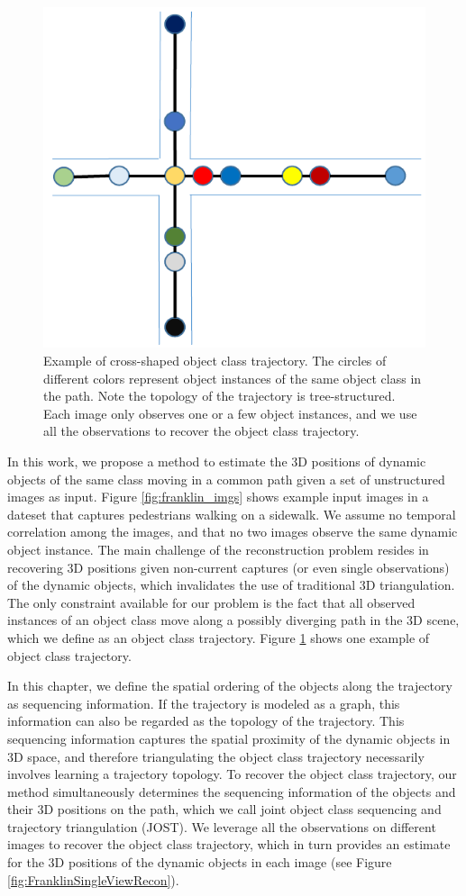 \begin{figure}
\centering
\includegraphics[width=0.65\linewidth]{chapter4/resource/path_cropped.pdf}
\caption[Example of cross-shaped object class trajectory.]{Example of cross-shaped object class trajectory. The circles of different colors represent object instances of the same object class in the path. Note the topology of the trajectory is tree-structured. Each image only observes one or a few object instances, and we use all the observations to recover the object class trajectory.}
\label{fig:oct_example}
\end{figure}

In this work, we propose a method to estimate the 3D positions of dynamic objects of the same class moving in a common path given a set of unstructured images as input. 
Figure \ref{fig:franklin_imgs} shows example input images in a dateset that captures  pedestrians walking on a sidewalk. We assume no temporal correlation among the images, and that no two images observe the same dynamic object instance. 
The main challenge of the reconstruction problem resides in recovering 3D positions given  non-current captures (or even single observations) of the dynamic objects, which invalidates the use of traditional 3D triangulation. The only constraint available for our problem is the fact that all observed instances of an object class move along a possibly diverging path in the 3D scene, which we define as an object class trajectory.
Figure \ref{fig:oct_example} shows one example of object class trajectory.

In this chapter, we define the spatial ordering of the objects along the trajectory as sequencing information. If the trajectory is modeled as a graph, this information can also be regarded as the topology of the trajectory. This sequencing information captures the spatial proximity of the dynamic objects in 3D space, and therefore triangulating the object class trajectory necessarily involves learning a trajectory topology.
To recover the object class trajectory, our method simultaneously determines the sequencing information of the objects and their 3D positions on the path, which we call joint object class sequencing and trajectory triangulation (JOST). We leverage all the observations on different images to recover the object class trajectory, which in turn provides an estimate for the 3D positions of the dynamic objects in each image (see Figure \ref{fig:FranklinSingleViewRecon}).



